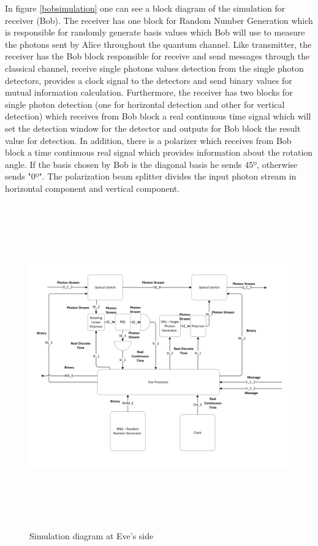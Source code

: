      In figure \ref{bobsimulation} one can see a block diagram of the simulation for receiver (Bob). The receiver has one block for Random Number Generation which is responsible for randomly generate basis values which Bob will use to measure the photons sent by Alice throughout the quantum channel. Like transmitter, the receiver has the Bob block responsible for receive and send messages through the classical channel, receive single photons values detection from the single photon detectors, provides a clock signal to the detectors and send binary values for mutual information calculation. Furthermore, the receiver has two blocks for single photon detection (one for horizontal detection and other for vertical detection) which receives from Bob block a real continuous time signal which will set the detection window for the detector and outputs for Bob block the result value for detection. In addition, there is a polarizer which receives from Bob block a time continuous real signal which provides information about the rotation angle. If the basis chosen by Bob is the diagonal basis he sends $45º$, otherwise sends "0º". The polarization beam splitter divides the input photon stream in horizontal component and vertical component.




\begin{figure}[h]
	\centering
	\includegraphics[width=1.1\textwidth, height=14cm]{./sdf/bb84_with_discrete_variables/figures/eve_simulation.png}
	\caption{Simulation diagram at Eve's side}\label{evesimulation}
\end{figure}

